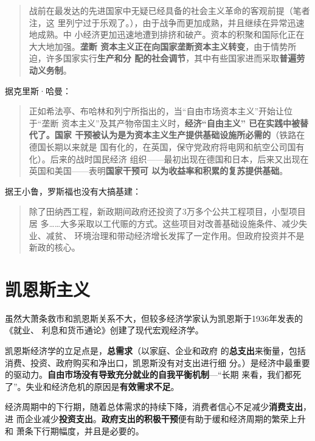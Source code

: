 \begin{enumerate}
\begin{quotation}
    战前在最发达的先进国家中无疑已经具备的社会主义革命的客观前提（笔者注，这
    里列宁过于乐观了。），由于战争而更加成熟，并且继续在异常迅速地成熟。中
    小经济更加迅速地遭到排挤和破产。资本的积聚和国际化正在大大地加强。\textbf{垄断
      资本主义正在向国家垄断资本主义转变}，由于情势所迫，许多国家实行\textbf{生产和分
    配的社会调节}，其中有些国家进而采取\textbf{普遍劳动义务制}。\cite[441]{lenin29}
  \end{quotation}

  据克里斯·哈曼：
  \begin{quotation}
    正如希法亭、布哈林和列宁所指出的，当“自由市场资本主义”开始让位于“垄断
    资本主义”及其产物帝国主义时，\textbf{经济“自由主义” 已在实践中被替代了。国家
      干预被认为是为资本主义生产提供基础设施所必需的}（铁路在德国长期以来就是
    国有化的，在英国，保守党政府将电网和航空公司国有化）。后来的战时国民经济
    组织——最初出现在德国和日本，后来又出现在英国和美国——表明\textbf{国家干预可
      以为收益率和积累的复苏提供基础}。
  \end{quotation}

  据王小鲁，罗斯福也没有大搞基建：
  \begin{quotation}
    除了田纳西工程，新政期间政府还投资了3万多个公共工程项目，小型项目居
    多……大多采取以工代赈的方式。这些项目对改善基础设施条件、减少失业、减贫、
    环境治理和带动经济增长发挥了一定作用。但政府投资并不是新政的核心。
  \end{quotation}

\end{enumerate}

\section{凯恩斯主义}

虽然大萧条救市和凯恩斯关系不大，但较多经济学家认为凯恩斯于1936年发表的《就业、
利息和货币通论》创建了现代宏观经济学。

凯恩斯经济学\cite{jahan2014keynesian}的立足点是，\textbf{总需求}（以家庭、企业和政府
的\textbf{总支出}来衡量，包括消费、投资、政府购买和净出口，凯恩斯没有对支出进行细
分。）是经济中最重要的驱动力。\textbf{自由市场没有导致充分就业的自我平衡机制}---“长期
来看，我们都死了”。失业和经济危机的原因是\textbf{有效需求不足}。

经济周期中的下行期，随着总体需求的持续下降，消费者信心不足减少\textbf{消费支出}，进
而企业减少\textbf{投资支出}。\textbf{政府支出的积极干预}便有助于缓和经济周期的繁荣上升和
萧条下行期幅度，并且是必要的。

